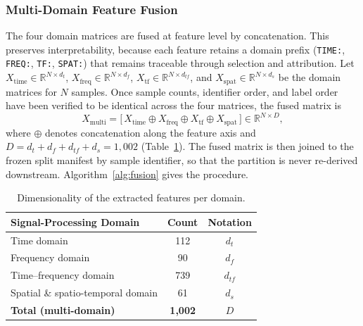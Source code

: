 \subsubsection{Multi-Domain Feature Fusion}
\label{sec:chap3Fusion}
The four domain matrices are fused at feature level by concatenation. This preserves interpretability, because each feature retains a domain prefix (\texttt{TIME:}, \texttt{FREQ:}, \texttt{TF:}, \texttt{SPAT:}) that remains traceable through selection and attribution. Let $X_{\mathrm{time}} \in \mathbb{R}^{N \times d_t}$, $X_{\mathrm{freq}} \in \mathbb{R}^{N \times d_f}$, $X_{\mathrm{tf}} \in \mathbb{R}^{N \times d_{tf}}$, and $X_{\mathrm{spat}} \in \mathbb{R}^{N \times d_s}$ be the domain matrices for $N$ samples. Once sample counts, identifier order, and label order have been verified to be identical across the four matrices, the fused matrix is
\begin{equation}
	X_{\mathrm{multi}} = \bigl[\, X_{\mathrm{time}} \oplus X_{\mathrm{freq}} \oplus X_{\mathrm{tf}} \oplus X_{\mathrm{spat}} \,\bigr] \in \mathbb{R}^{N \times D},
	\label{eq:fusion}
\end{equation}
where $\oplus$ denotes concatenation along the feature axis and $D = d_t + d_f + d_{tf} + d_s = 1{,}002$ (Table~\ref{tab:dimensionality}). The fused matrix is then joined to the frozen split manifest by sample identifier, so that the partition is never re-derived downstream. Algorithm~\ref{alg:fusion} gives the procedure.

\begin{table}[!htb]
	\centering
	\caption{Dimensionality of the extracted features per domain.}
	\label{tab:dimensionality}
	\small
	\setlength{\tabcolsep}{4pt}
	\renewcommand{\arraystretch}{0.95}
	\begin{tabular}{@{}lcc@{}}
		\toprule
		\textbf{Signal-Processing Domain} & \textbf{Count} & \textbf{Notation}\\
		\midrule
		Time domain                       & 112  & $d_t$\\
		Frequency domain                  & 90   & $d_f$\\
		Time--frequency domain            & 739  & $d_{tf}$\\
		Spatial \& spatio-temporal domain & 61   & $d_s$\\
		\midrule
		\textbf{Total (multi-domain)}     & \textbf{1{,}002} & $D$\\
		\bottomrule
	\end{tabular}
\end{table}

